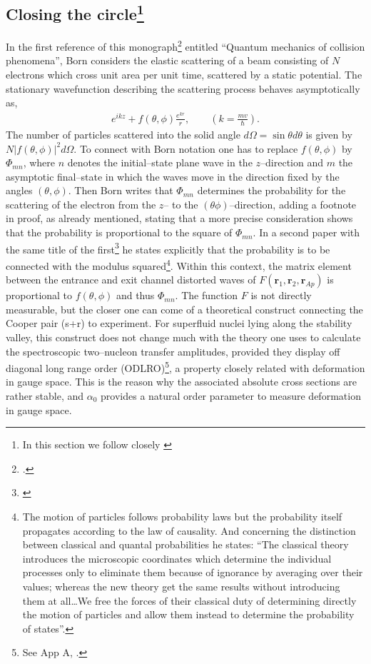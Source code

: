 \subsection[Closing the circle]{Closing the circle\footnote{In this section we follow closely \cite{Pais:86}}}
In the first reference of this monograph\footnote{\cite{Born:26}.} entitled ``Quantum mechanics of collision phenomena'', Born considers the elastic scattering of a beam consisting of $N$ electrons which cross unit area per unit time, scattered by a static potential. The stationary wavefunction describing the scattering process behaves asymptotically as,
\begin{align}
e^{ikz}+f(\theta,\phi)\frac{e^{kr}}{r},\quad\quad \left(k=\frac{mv}{\hbar}\right).
\end{align}
The number of particles scattered into the solid angle $d\Omega=\sin\theta d\theta$ is given by $N|f(\theta,\phi)|^2d\Omega$. To connect with Born notation one has to replace $f(\theta,\phi)$ by $\Phi_{mn}$, where $n$ denotes the initial--state plane wave in the $z$--direction and $m$ the asymptotic final--state in which the waves move in the direction fixed by the angles $(\theta,\phi)$. Then Born writes that $\Phi_{mn}$ determines the probability for the scattering of the electron from the $z$-- to the $(\theta\phi)$--direction, adding a footnote in proof, as already mentioned, stating that a more precise consideration shows that the probability is proportional to the square of $\Phi_{mn}$. In a second paper with the same title of the first\footnote{\cite{Born:26b}} he states explicitly that the probability is to be connected with the modulus squared\footnote{The motion of particles follows probability laws but the probability itself propagates according to the law of causality. And concerning the distinction between classical and quantal probabilities he states: ``The classical theory introduces the microscopic coordinates which determine the individual processes only to eliminate them because of ignorance by averaging over their values; whereas the new theory get the same results without introducing them at all\dots We free the forces of their classical duty of determining directly the motion of particles and allow them instead to determine the probability of states''.}. Within this context, the matrix element between the entrance and exit channel distorted waves of $F(\mathbf r_1,\mathbf r_2,\mathbf r_{Ap})$ is proportional to $f(\theta,\phi)$ and thus $\Phi_{mn}$. The function $F$ is not directly measurable, but the closer one can come of a theoretical construct connecting the Cooper pair (s+r) to experiment. For superfluid nuclei lying along the stability valley, this construct does not change much with the theory one uses to calculate the spectroscopic two--nucleon transfer amplitudes,  provided they display off diagonal long range order (ODLRO)\footnote{See App A, \cite{Potel:17}.}, a property closely related with deformation in gauge space. This is the reason why the associated absolute cross sections are rather stable, and $\alpha_0$ provides a natural order parameter to measure deformation in gauge space.


